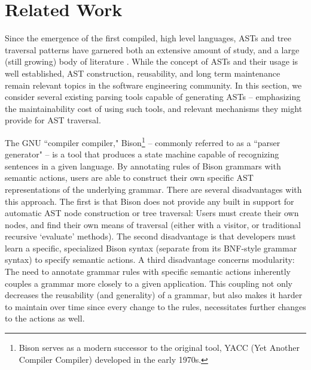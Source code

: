\documentclass[times]{speauth}
\begin{document}
\vspace{-6pt}


\section{Related Work}
\vspace{-2pt}

Since the emergence of the first compiled, high level languages, ASTs and tree traversal patterns have garnered both an extensive amount of study, and a large (still growing) body of literature \cite{tanumoy:2012}. While the concept of ASTs and their usage is well established, AST construction, reusability, and long term maintenance remain relevant topics in the software engineering community. In this section, we consider several existing parsing tools capable of generating ASTs -- emphasizing the maintainability cost of using such tools, and relevant mechanisms they might provide for AST traversal.

The GNU ``compiler compiler," Bison\footnote{Bison serves as a modern successor to the original tool, YACC (Yet Another Compiler Compiler) developed in the early 1970s.} \cite{levine:1992} -- commonly referred to as a ``parser generator" -- is a tool that produces a state machine capable of recognizing sentences in a given language. By annotating rules of Bison grammars with semantic actions, users are able to construct their own specific AST representations of the underlying grammar. There are several disadvantages with this approach. The first is that Bison does not provide any built in support for automatic AST node construction or tree traversal: Users must create their own nodes, and find their own means of traversal (either with a visitor, or traditional recursive `evaluate' methods). The second disadvantage is that developers must learn a specific, specialized Bison syntax (separate from its BNF-style grammar syntax) to specify semantic actions. A third disadvantage concerns modularity: The need to annotate grammar rules with specific semantic actions inherently couples a grammar more closely to a given application. This coupling not only decreases the reusability (and generality) of a grammar, but also makes it harder to maintain over time since every change to the rules, necessitates further changes to the actions as well.
\end{document}
